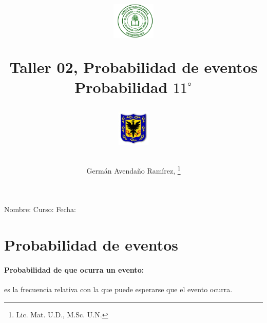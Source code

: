 \documentclass[10pt,twoside]{article}
\author{Germ\'an Avenda\~no Ram\'irez, \thanks{Lic. Mat. U.D., M.Sc. U.N.
}}
\title{\begin{minipage}{.2\textwidth}
\includegraphics[height=1.75cm]{Images/logo-colegio.png}\end{minipage}
\begin{minipage}{.55\textwidth}
\begin{center}
Taller 02, Probabilidad de eventos  \\
Probabilidad $11^{\circ}$
\end{center}
\end{minipage}\hfill
\begin{minipage}{.2\textwidth}
\includegraphics[height=1.75cm]{Images/logo-sed.png} 
\end{minipage}}
\date{}
\begin{document}
\maketitle
Nombre: \hrulefill Curso: \underline{\hspace*{44pt}} Fecha: \underline{\hspace*{2.5cm}}
\section*{Probabilidad de eventos}
\paragraph*{Probabilidad de que ocurra un evento:} es la frecuencia relativa con la que puede esperarse que el evento ocurra.
\end{document}

